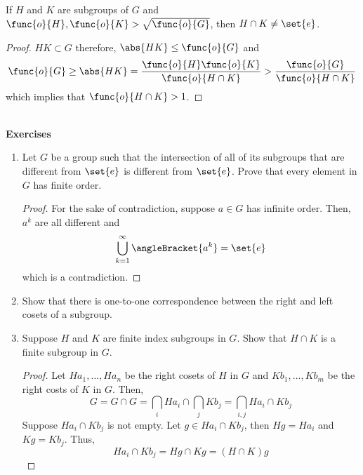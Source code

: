 \begin{corollary}
    If \(H\) and \(K\) are subgroups of \(G\) and \(\func{o}{H},\func{o}{K} > \sqrt{\func{o}{G}}\), then \(H \cap K \neq \set{e}\).
\end{corollary}

\begin{proof}
    \(HK \subset G\) therefore, \(\abs{HK} \leq \func{o}{G}\) and 
    \begin{equation*}
        \func{o}{G} \geq \abs{HK}  = \dfrac{\func{o}{H} \func{o}{K}}{\func{o}{H \cap K}} > \dfrac{\func{o}{G}}{\func{o}{H \cap K}} 
    \end{equation*}
    which implies that \(\func{o}{H \cap K} > 1\).
\end{proof}
\ \\ 
{\Large{\textbf{Exercises}}}
\begin{enumerate}
    \item Let \(G\) be a group such that the intersection of all of its subgroups that are different from \(\set{e}\) is different from \(\set{e}\). Prove that every element in \(G\) has finite order.
    \begin{proof}
        For the sake of contradiction, suppose \(a \in G\) has infinite order. Then, \(a^k\) are all different and 
        \begin{equation*}
            \bigcup_{k = 1}^{\infty} \angleBracket{a^k} = \set{e}
        \end{equation*}
        which is a contradiction.
    \end{proof}
    \item Show that there is one-to-one correspondence between the right and left cosets of a subgroup.
    \item Suppose \(H\) and \(K\) are finite index subgroups in \(G\). Show that \(H \cap K\) is a finite subgroup in \(G\).
    \begin{proof}
        Let \(Ha_1, \dots , Ha_n\) be the right cosets of \(H\) in \(G\) and \(Kb_1, \dots , Kb_m\) be the right costs of \(K\) in \(G\). Then, 
        \begin{equation*}
            G = G \cap G = \bigcap_i Ha_i \cap \bigcap_j Kb_j = \bigcap_{i,j} Ha_i \cap Kb_j
        \end{equation*}
        Suppose \(Ha_i \cap Kb_j\) is not empty. Let \(g \in Ha_i \cap Kb_j\), then \(Hg = Ha_i\) and \(Kg = Kb_j\). Thus, 
        \begin{equation*}
            Ha_i \cap Kb_j = Hg \cap Kg = (H \cap K)g
        \end{equation*}

\end{proof}
\end{enumerate}
